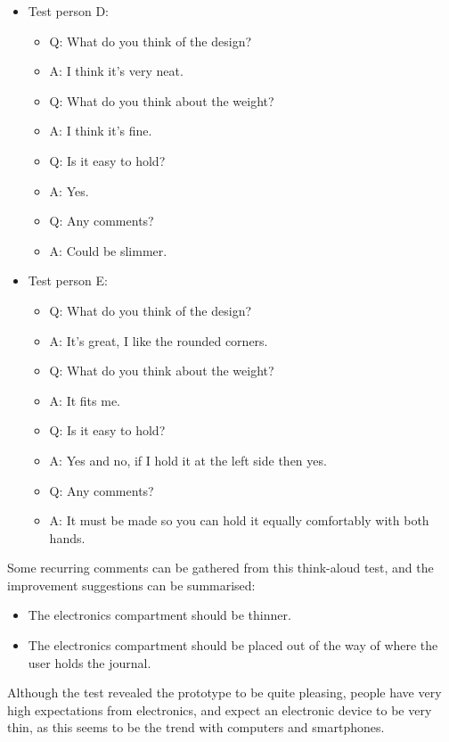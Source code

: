 \begin{itemize}
	\item Test person D:
		\begin{itemize} \itemsep0em
			\item Q: What do you think of the design?
			\item A: I think it's very neat.
			\item Q: What do you think about the weight?
			\item A: I think it's fine.
			\item Q: Is it easy to hold?
			\item A: Yes.
			\item Q: Any comments?
			\item A: Could be slimmer.
		\end{itemize}

	\item Test person E:
		\begin{itemize} \itemsep0em
			\item Q: What do you think of the design?
			\item A: It's great, I like the rounded corners.
			\item Q: What do you think about the weight?
			\item A: It fits me.
			\item Q: Is it easy to hold?
			\item A: Yes and no, if I hold it at the left side then yes.
			\item Q: Any comments?
			\item A: It must be made so you can hold it equally comfortably with both hands.
		\end{itemize}					
\end{itemize}

\clearpage

Some recurring comments can be gathered from this think-aloud test, and the improvement suggestions can be summarised:
\begin{itemize} \itemsep0em
	\item The electronics compartment should be thinner.
	\item The electronics compartment should be placed out of the way of where the user holds the journal.
\end{itemize}

Although the test revealed the prototype to be quite pleasing, people have very high expectations from electronics, and expect an electronic device to be very thin, as this seems to be the trend with computers and smartphones. \\

